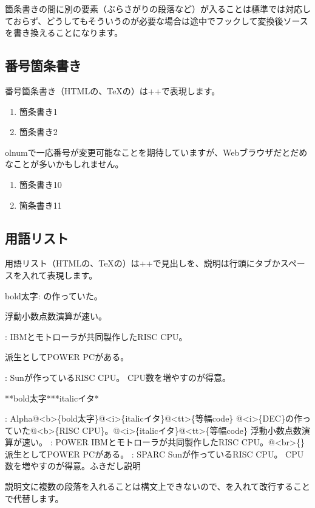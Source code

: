 箇条書きの間に別の要素（ぶらさがりの段落など）が入ることは標準では対応しておらず、どうしてもそういうのが必要な場合は途中でフックして変換後ソースを書き換えることになります。

\subsection{番号箇条書き}
\label{sec:1-3-2}

番号箇条書き（HTMLの、TeXの）は++で表現します。


\begin{enumerate}
\item 箇条書き1
\item 箇条書き2
\end{enumerate}

olnumで一応番号が変更可能なことを期待していますが、Webブラウザだとだめなことが多いかもしれません。


\begin{enumerate}
\item 箇条書き10
\item 箇条書き11
\end{enumerate}

\subsection{用語リスト}
\label{sec:1-3-3}

用語リスト（HTMLの、TeXの）は+\reviewcode{:}+で見出しを、説明は行頭にタブかスペースを入れて表現します。

bold太字: の作っていた。 

浮動小数点数演算が速い。

: IBMとモトローラが共同製作したRISC CPU。

派生としてPOWER PCがある。

: Sunが作っているRISC CPU。 CPU数を増やすのが得意。

\begin{reviewlistblock}
\begin{reviewemlist}
**bold太字***italicイタ*

 : Alpha@\textless{}b\textgreater{}\{bold太字\}@\textless{}i\textgreater{}\{italicイタ\}@\textless{}tt\textgreater{}\{等幅code\}
        @\textless{}i\textgreater{}\{DEC\}の作っていた@\textless{}b\textgreater{}\{RISC CPU\}。@\textless{}i\textgreater{}\{italicイタ\}@\textless{}tt\textgreater{}\{等幅code\}
        浮動小数点数演算が速い。
 : POWER
        IBMとモトローラが共同製作したRISC CPU。@\textless{}br\textgreater{}\{\}
        派生としてPOWER PCがある。
 : SPARC
        Sunが作っているRISC CPU。
        CPU数を増やすのが得意。ふきだし説明
\end{reviewemlist}
\end{reviewlistblock}

説明文に複数の段落を入れることは構文上できないので、を入れて改行することで代替します。
